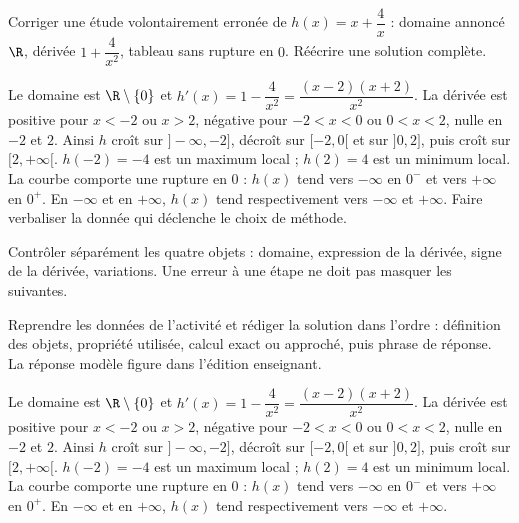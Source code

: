 \begin{activity}
Corriger une étude volontairement erronée de $h(x)=x+\dfrac4x$ : domaine annoncé $\R$, dérivée $1+\dfrac4{x^2}$, tableau sans rupture en $0$. Réécrire une solution complète.

\end{activity}
\begin{solution}Le domaine est $\R\setminus\{0\}$ et $h'(x)=1-\dfrac4{x^2}=\dfrac{(x-2)(x+2)}{x^2}$. La dérivée est positive pour $x<-2$ ou $x>2$, négative pour $-2<x<0$ ou $0<x<2$, nulle en $-2$ et $2$. Ainsi $h$ croît sur $]-\infty,-2]$, décroît sur $[-2,0[$ et sur $]0,2]$, puis croît sur $[2,+\infty[$. $h(-2)=-4$ est un maximum local ; $h(2)=4$ est un minimum local. La courbe comporte une rupture en $0$ : $h(x)$ tend vers $-\infty$ en $0^-$ et vers $+\infty$ en $0^+$. En $-\infty$ et en $+\infty$, $h(x)$ tend respectivement vers $-\infty$ et $+\infty$. Faire verbaliser la donnée qui déclenche le choix de méthode.\end{solution}

\begin{summary}Contrôler séparément les quatre objets : domaine, expression de la dérivée, signe de la dérivée, variations. Une erreur à une étape ne doit pas masquer les suivantes.\end{summary}

\begin{example}
Reprendre les données de l'activité et rédiger la solution dans l'ordre : définition des objets, propriété utilisée, calcul exact ou approché, puis phrase de réponse. La réponse modèle figure dans l'édition enseignant.
\end{example}
\begin{solution}Le domaine est $\R\setminus\{0\}$ et $h'(x)=1-\dfrac4{x^2}=\dfrac{(x-2)(x+2)}{x^2}$. La dérivée est positive pour $x<-2$ ou $x>2$, négative pour $-2<x<0$ ou $0<x<2$, nulle en $-2$ et $2$. Ainsi $h$ croît sur $]-\infty,-2]$, décroît sur $[-2,0[$ et sur $]0,2]$, puis croît sur $[2,+\infty[$. $h(-2)=-4$ est un maximum local ; $h(2)=4$ est un minimum local. La courbe comporte une rupture en $0$ : $h(x)$ tend vers $-\infty$ en $0^-$ et vers $+\infty$ en $0^+$. En $-\infty$ et en $+\infty$, $h(x)$ tend respectivement vers $-\infty$ et $+\infty$.\end{solution}

